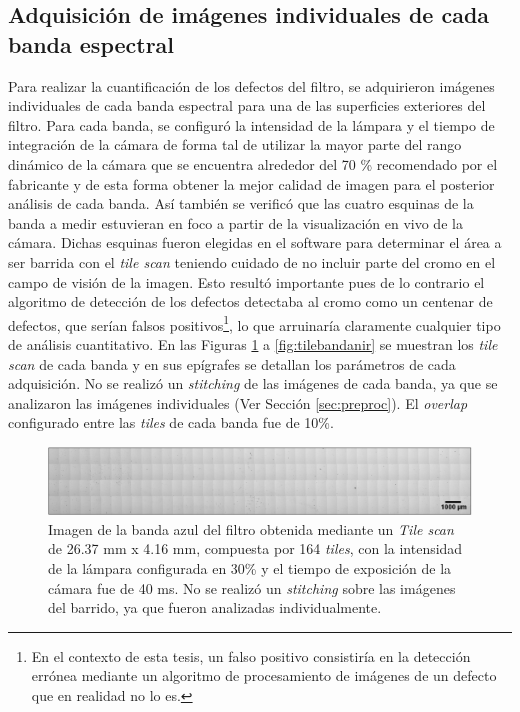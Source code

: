 \singlespacing
\subsection{Adquisición de imágenes individuales de cada banda espectral}
\label{sec:cadab}

\hspace{0.5cm}Para realizar la cuantificación de los defectos del filtro, se adquirieron imágenes individuales de cada banda espectral para una de las superficies exteriores del filtro. Para cada banda, se configuró la intensidad de la lámpara y el tiempo de integración de la cámara de forma tal de utilizar la mayor parte del rango dinámico de la cámara que se encuentra alrededor del 70 \% recomendado por el fabricante y de esta forma obtener la mejor calidad de imagen para el posterior análisis de cada banda. Así también se verificó que las cuatro esquinas de la banda a medir estuvieran en foco a partir de la visualización en vivo de la cámara. Dichas esquinas fueron elegidas en el software para determinar el área a ser barrida con el \textit{tile scan} teniendo cuidado de no incluir parte del cromo en el campo de visión de la imagen. Esto resultó importante pues de lo contrario el algoritmo de detección de los defectos detectaba al cromo como un centenar de defectos, que serían falsos positivos\footnote{En el contexto de esta tesis, un falso positivo consistiría en la detección errónea mediante un algoritmo de procesamiento de imágenes de un defecto que en realidad no lo es.}, lo que arruinaría claramente cualquier tipo de análisis cuantitativo. En las Figuras \ref{fig:tilebandaazul} a \ref{fig:tilebandanir} se muestran los \textit{tile scan} de cada banda y en sus epígrafes se detallan los parámetros de cada adquisición. No se realizó un \textit{stitching} de las imágenes de cada banda, ya que se analizaron las imágenes individuales (Ver Sección \ref{sec:preproc}). El \textit{overlap} configurado entre las \textit{tiles} de cada banda fue de 10\%.
\begin{figure}[H]
	\centering
	\includegraphics[width=1.0\textwidth]{Figs/cuantificaciondefectos/banda_AZUL.png}
	\caption{Imagen de la banda azul del filtro obtenida mediante un \textit{Tile scan} de 26.37 mm x 4.16 mm, compuesta por 164 \textit{tiles}, con la intensidad de la lámpara configurada en 30\% y el tiempo de exposición de la cámara fue de 40 ms. No se realizó un \textit{stitching} sobre las imágenes del barrido, ya que fueron analizadas individualmente.}
	\label{fig:tilebandaazul}
\end{figure}
